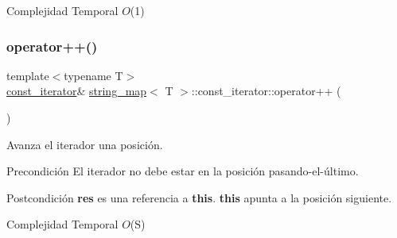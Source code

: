 \begin{DoxyDescription}
\item[Complejidad Temporal]$O$(1)
\end{DoxyDescription}\mbox{\label{classstring__map_1_1const__iterator_a89c1052c14532e8a7ef1e0bb5846b27a}} 
\subsubsection{\texorpdfstring{operator++()}{operator++()}\hspace{0.1cm}{\footnotesize\ttfamily [1/2]}}
{\footnotesize\ttfamily template$<$typename T$>$ \\
\mbox{\hyperlink{classstring__map_1_1const__iterator}{const\+\_\+iterator}}\& \mbox{\hyperlink{classstring__map}{string\+\_\+map}}$<$ T $>$\+::const\+\_\+iterator\+::operator++ (\begin{DoxyParamCaption}{ }\end{DoxyParamCaption})\hspace{0.3cm}{\ttfamily [inline]}}



Avanza el iterador una posición. 

\begin{DoxyPrecond}{Precondición}
El iterador no debe estar en la posición pasando-\/el-\/último. 
\end{DoxyPrecond}
\begin{DoxyPostcond}{Postcondición}
{\bfseries res} es una referencia a {\bfseries this}. {\bfseries this} apunta a la posición siguiente.
\end{DoxyPostcond}

\begin{DoxyDescription}
\item[Complejidad Temporal]$O$(S)
\end{DoxyDescription}\mbox{\label{classstring__map_1_1const__iterator_ac4da309759fa2dd7d73eeef070b9ec0e}} 
